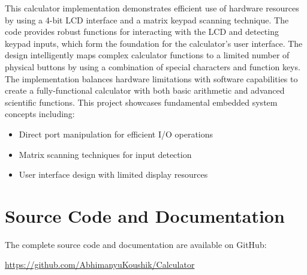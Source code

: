 \documentclass[12pt]{article}
\begin{document}
This calculator implementation demonstrates efficient use of hardware resources by using a 4-bit LCD interface and a matrix keypad scanning technique. The code provides robust functions for interacting with the LCD and detecting keypad inputs, which form the foundation for the calculator's user interface.
\newline
The design intelligently maps complex calculator functions to a limited number of physical buttons by using a combination of special characters and function keys. The implementation balances hardware limitations with software capabilities to create a fully-functional calculator with both basic arithmetic and advanced scientific functions.
\newline
This project showcases fundamental embedded system concepts including:
\begin{itemize}
\item Direct port manipulation for efficient I/O operations
\item Matrix scanning techniques for input detection
\item User interface design with limited display resources
\end{itemize}

\section{Source Code and Documentation}
The complete source code and documentation are available on GitHub:
\begin{center}
\href{https://github.com/AbhimanyuKoushik/nice_stuff/tree/main/codes/Arduino/Calculator}{https://github.com/AbhimanyuKoushik/Calculator}
\end{center}
\end{document}
